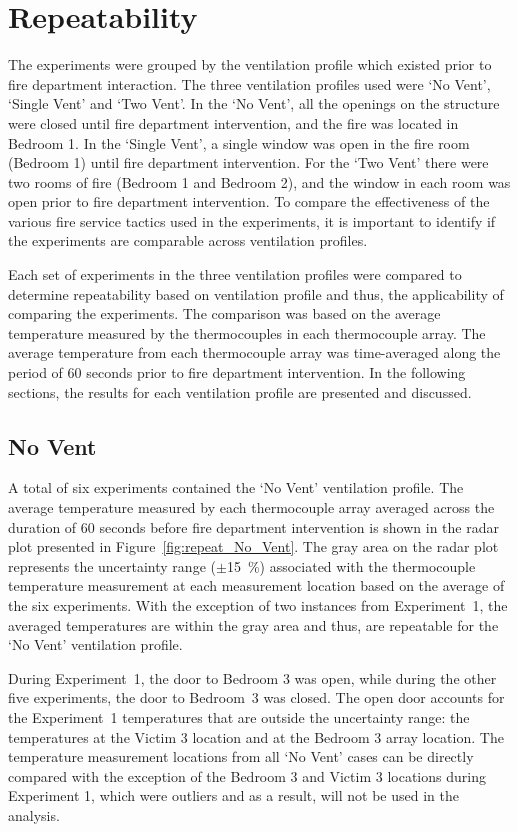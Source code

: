 \documentclass[12pt,oneside]{book}
\begin{document}
\section{Repeatability}
The experiments were grouped by the ventilation profile which existed prior to fire department interaction. The three ventilation profiles used were `No Vent', `Single Vent' and `Two Vent'. In the `No Vent', all the openings on the structure were closed until fire department intervention, and the fire was located in Bedroom 1. In the `Single Vent', a single window was open in the fire room (Bedroom 1) until fire department intervention. For the `Two Vent' there were two rooms of fire (Bedroom 1 and Bedroom 2), and the window in each room was open prior to fire department intervention. To compare the effectiveness of the various fire service tactics used in the experiments, it is important to identify if the experiments are comparable across ventilation profiles. 

Each set of experiments in the three ventilation profiles were compared to determine repeatability based on ventilation profile and thus, the applicability of comparing the experiments. The comparison was based on the average temperature measured by the thermocouples in each thermocouple array. The average temperature from each thermocouple array was time-averaged along the period of 60 seconds prior to fire department intervention. In the following sections, the results for each ventilation profile are presented and discussed. 

\subsection{No Vent}
A total of six experiments contained the `No Vent' ventilation profile. The average temperature measured by each thermocouple array averaged across the duration of 60 seconds before fire department intervention is shown in the radar plot presented in Figure~\ref{fig:repeat_No_Vent}. The gray area on the radar plot represents the uncertainty range ($\pm$15~\%) associated with the thermocouple temperature measurement at each measurement location based on the average of the six experiments. With the exception of two instances from Experiment~1, the averaged temperatures are within the gray area and thus, are repeatable for the `No Vent' ventilation profile. 

During Experiment~1, the door to Bedroom 3 was open, while during the other five experiments, the door to Bedroom~3 was closed. The open door accounts for the Experiment~1 temperatures that are outside the uncertainty range: the temperatures at the Victim 3 location and at the Bedroom 3 array location. The temperature measurement locations from all `No Vent' cases can be directly compared with the exception of the Bedroom 3 and Victim 3 locations during Experiment 1, which were outliers and as a result, will not be used in the analysis. 
\end{document}
